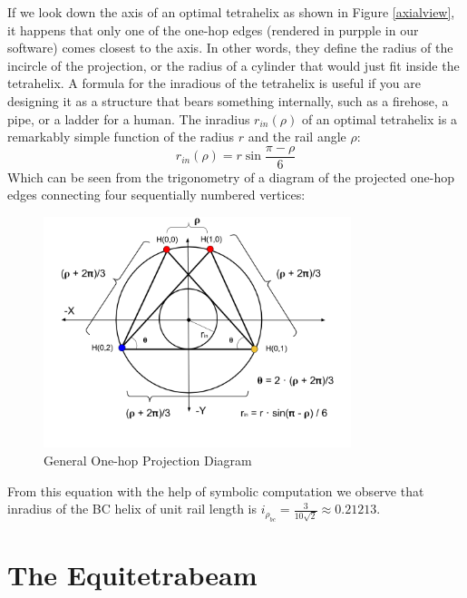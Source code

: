 \documentclass[11pt]{article}
\begin{document}
If we look down the axis of an optimal tetrahelix as shown in Figure \ref{axialview}, it happens that only one of the one-hop edges
(rendered in purpple in our software)
comes closest to the axis. In other words, they define the radius of the incircle of the
projection, or the radius of a cylinder that would just fit inside the tetrahelix.
A formula for the inradious of the tetrahelix is useful if you are designing it as a structure that bears something internally,
such as a firehose, a pipe, or
a ladder for a human. The inradius $r_{in}(\rho)$ of
an optimal tetrahelix is a remarkably simple function of the radius $r$ and the rail angle $\rho$:
\begin{equation}
  \label{eq:inradius}
  r_{in}(\rho) = r \sin{\frac{\pi - \rho}{6}}
\end{equation}
Which can be seen from the trigonometry of a diagram of the projected one-hop edges
connecting four sequentially numbered vertices:

\begin{figure}[H]
     \centering
     \includegraphics[width=0.8\textwidth]{figures/ProjectionDiagram.png}
     \caption{General One-hop Projection Diagram}
  \label{projectiondiagram}
     
\end{figure}

From this equation with the help of symbolic computation we observe that inradius of the BC helix of unit rail length is $i_{\rho_{bc}} = \frac{3}{10\sqrt{2}} \approx 0.21213$.

\section{The Equitetrabeam}
\label{sec:equitetrabeam}
\end{document}
